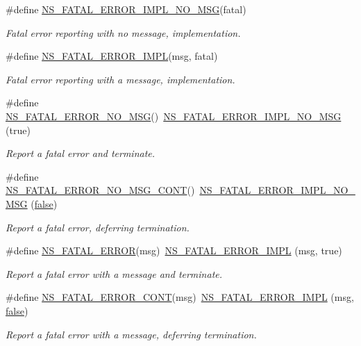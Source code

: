 \begin{DoxyCompactItemize}
\#define \hyperlink{group__fatal_ga0c4238330e9f9d2a304131a45251980b}{N\+S\+\_\+\+F\+A\+T\+A\+L\+\_\+\+E\+R\+R\+O\+R\+\_\+\+I\+M\+P\+L\+\_\+\+N\+O\+\_\+\+M\+SG}(fatal)
\begin{DoxyCompactList}\small\item\em Fatal error reporting with no message, implementation. \end{DoxyCompactList}\item 
\#define \hyperlink{group__fatal_gadb2a57b89e19d41a406ce49bb3d77664}{N\+S\+\_\+\+F\+A\+T\+A\+L\+\_\+\+E\+R\+R\+O\+R\+\_\+\+I\+M\+PL}(msg,  fatal)
\begin{DoxyCompactList}\small\item\em Fatal error reporting with a message, implementation. \end{DoxyCompactList}\item 
\#define \hyperlink{group__fatal_gabe68f8439b933855d5f829072c58e1e5}{N\+S\+\_\+\+F\+A\+T\+A\+L\+\_\+\+E\+R\+R\+O\+R\+\_\+\+N\+O\+\_\+\+M\+SG}()~\hyperlink{group__fatal_ga0c4238330e9f9d2a304131a45251980b}{N\+S\+\_\+\+F\+A\+T\+A\+L\+\_\+\+E\+R\+R\+O\+R\+\_\+\+I\+M\+P\+L\+\_\+\+N\+O\+\_\+\+M\+SG} (true)
\begin{DoxyCompactList}\small\item\em Report a fatal error and terminate. \end{DoxyCompactList}\item 
\#define \hyperlink{group__fatal_ga375f5661b840c7b761ca8e8f96687d98}{N\+S\+\_\+\+F\+A\+T\+A\+L\+\_\+\+E\+R\+R\+O\+R\+\_\+\+N\+O\+\_\+\+M\+S\+G\+\_\+\+C\+O\+NT}()~\hyperlink{group__fatal_ga0c4238330e9f9d2a304131a45251980b}{N\+S\+\_\+\+F\+A\+T\+A\+L\+\_\+\+E\+R\+R\+O\+R\+\_\+\+I\+M\+P\+L\+\_\+\+N\+O\+\_\+\+M\+SG} (\hyperlink{lte__cqi__generation_8m_ab1bef239d413c4da139c4bac92cd657a}{false})
\begin{DoxyCompactList}\small\item\em Report a fatal error, deferring termination. \end{DoxyCompactList}\item 
\#define \hyperlink{group__fatal_ga5131d5e3f75d7d4cbfd706ac456fdc85}{N\+S\+\_\+\+F\+A\+T\+A\+L\+\_\+\+E\+R\+R\+OR}(msg)~\hyperlink{group__fatal_gadb2a57b89e19d41a406ce49bb3d77664}{N\+S\+\_\+\+F\+A\+T\+A\+L\+\_\+\+E\+R\+R\+O\+R\+\_\+\+I\+M\+PL} (msg, true)
\begin{DoxyCompactList}\small\item\em Report a fatal error with a message and terminate. \end{DoxyCompactList}\item 
\#define \hyperlink{group__fatal_ga14a612271304da0eaf6d5018c0b5b5a5}{N\+S\+\_\+\+F\+A\+T\+A\+L\+\_\+\+E\+R\+R\+O\+R\+\_\+\+C\+O\+NT}(msg)~\hyperlink{group__fatal_gadb2a57b89e19d41a406ce49bb3d77664}{N\+S\+\_\+\+F\+A\+T\+A\+L\+\_\+\+E\+R\+R\+O\+R\+\_\+\+I\+M\+PL} (msg, \hyperlink{lte__cqi__generation_8m_ab1bef239d413c4da139c4bac92cd657a}{false})
\begin{DoxyCompactList}\small\item\em Report a fatal error with a message, deferring termination. \end{DoxyCompactList}\end{DoxyCompactItemize}


